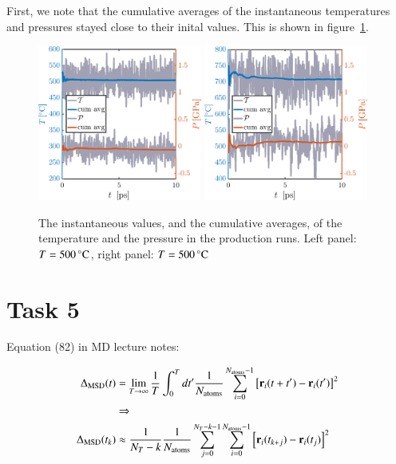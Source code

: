 First, we note that the cumulative averages of the instantaneous temperatures and pressures stayed close to their inital values. This is shown in figure~\ref{fig:prod}.

\begin{figure}[!ht]
\begin{center}
  \includegraphics[width=0.48\textwidth]{../figures/TP-prod-500} 
    \includegraphics[width=0.48\textwidth]{../figures/TP-prod-700} 
  \caption{The instantaneous values, and the cumulative averages, of the temperature and the pressure in the production runs. Left panel: $T=\unit[500]{^\circ C}$,  right panel: $T=\unit[500]{^\circ C}$}
  \label{fig:prod}
\end{center}
\end{figure}

\section*{Task 5}
Equation (82) in MD lecture notes:


\begin{align}
\Delta_{\rm MSD}(t) &= \lim_{T \rightarrow \infty} \frac{1}{T} \int_0^{T} d t' \frac{1}{N_{\rm atoms}} \sum_{i=0}^{N_{\rm atoms}-1} \left[{\bf r}_i(t+t') - {\bf r}_i(t') \right]^2 \\ &\Rightarrow \nonumber
\\
\Delta_{\rm MSD}(t_k) &\approx
\frac{1}{N_T -k}\frac{1}{N_{\rm atoms}} \sum_{j=0}^{N_T-k-1} \sum_{i=0}^{N_{\rm atoms}-1} \left[{\bf r}_i(t_{k+j}) - {\bf r}_i(t_j) \right]^2 
\end{align}

